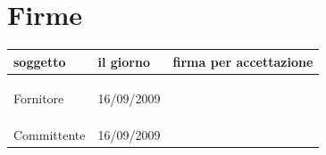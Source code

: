 \documentclass[a4paper, 12pt]{report}
\begin{document}
\newpage

\section*{Firme}
\begin{table}[h!]
  \begin{center}
    \begin{tabular}{ l  l | p{60mm} }
    \textbf{soggetto} & \textbf{il giorno} & \textbf{firma per accettazione} \\
	\hline    
	\\\\\\
	Fornitore & 16/09/2009 &  \\
	\hline\\\\\\
	Committente & 16/09/2009 &  \\
    \hline
    \end{tabular}
  \end{center}
\end{table}
\newpage
\end{document}
